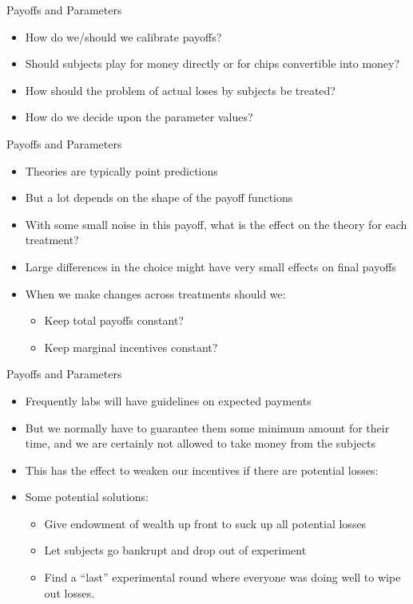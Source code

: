 \documentclass{beamer}
\begin{document}
\begin{frame}{Payoffs and Parameters}
	\begin{itemize}
		\item How do we/should we calibrate payoffs?
		\item Should subjects play for money directly or for chips convertible into money?
		\item How should the problem of actual loses by subjects be treated?
		\item How do we decide upon the parameter values?
	\end{itemize}
\end{frame}

\begin{frame}{Payoffs and Parameters}
	\begin{itemize}
		\item Theories are typically point predictions
		\item But a lot depends on the shape of the payoff functions
		\item With some small noise in this payoff, what is the effect on the theory for each treatment?
		\item Large differences in the choice might have very small effects on final payoffs
		\item When we make changes across treatments should we:
		\begin{itemize}
			\item Keep total payoffs constant?
			\item Keep marginal incentives constant?
		\end{itemize}
	\end{itemize}
\end{frame}

\begin{frame}{Payoffs and Parameters}
	\begin{itemize}
		\item Frequently labs will have guidelines on expected payments 
		\item But we normally have to guarantee them some minimum amount for their time, and we are certainly not allowed to take money from the subjects 
		\item This has the effect to weaken our incentives if there are potential losses:
		\item Some potential solutions:
		\begin{itemize}
			\item Give endowment of wealth up front to suck up all potential losses
			\item Let subjects go bankrupt and drop out of experiment
			\item Find a ``last'' experimental round where everyone was doing well to wipe out losses.
		\end{itemize}
	\end{itemize}
\end{frame}
\end{document}
